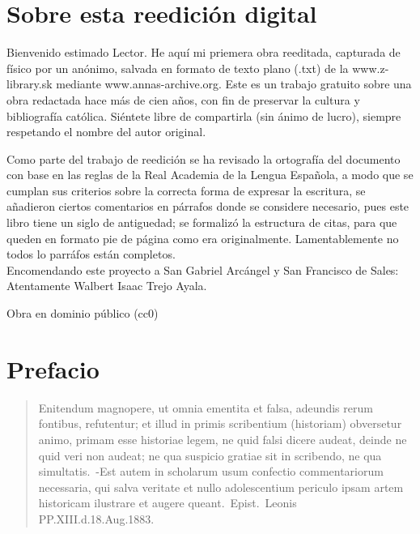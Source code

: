 \raggedbottom{} \documentclass[12pt, a4paper]{book}
\begin{document}
\section{Sobre esta reedición digital} %
Bienvenido estimado Lector. He aquí mi priemera obra reeditada, capturada de físico por un anónimo, salvada en formato de texto plano (.txt) de la www.z-library.sk mediante www.annas-archive.org\@. Este es un trabajo gratuito sobre una obra redactada hace más de cien años, con fin de preservar la cultura y bibliografía católica. Siéntete libre de compartirla (sin ánimo de lucro), siempre respetando el nombre del autor original.

Como parte del trabajo de reedición se ha revisado la ortografía del documento con base en las reglas de la Real Academia de la Lengua Española, a modo que se cumplan sus criterios sobre la correcta forma de expresar la escritura, se añadieron ciertos comentarios en párrafos donde se considere necesario, pues este libro tiene un siglo de antiguedad; se formalizó la estructura de citas, para que queden en formato pie de página como era originalmente. Lamentablemente no todos lo parráfos están completos.\\
Encomendando este proyecto a San Gabriel Arcángel y San Francisco de Sales: Atentamente Walbert Isaac Trejo Ayala.

Obra en dominio público (cc0)
\section{Prefacio}
\begin{quotation}
  Enitendum magnopere, ut omnia ementita et falsa, adeundis rerum fontibus, refutentur; et illud in primis scribentium (historiam) obversetur animo, primam esse historiae legem, ne quid falsi dicere audeat, deinde ne quid veri non audeat; ne qua suspicio gratiae sit in scribendo, ne qua simultatis.\ -Est autem in scholarum usum confectio commentariorum necessaria, qui salva veritate et nullo adolescentium periculo ipsam artem historicam ilustrare et augere queant.\ Epist.\ Leonis PP.\@ XIII.\@ d.\@ 18.\@ Aug.\@ 1883.
\end{quotation}
\end{document}
